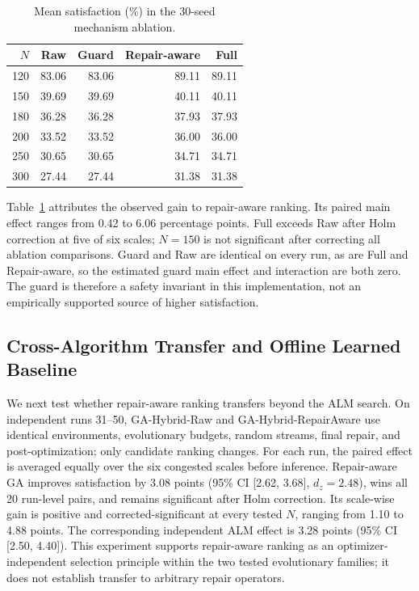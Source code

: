\begin{table}[t]
\centering
\caption{Mean satisfaction (\%) in the 30-seed mechanism ablation.}
\label{tab:official_ablation}
\small
\begin{tabular}{rrrrr}
\toprule
$N$ & Raw & Guard & Repair-aware & Full \\
\midrule
120 & 83.06 & 83.06 & 89.11 & 89.11 \\
150 & 39.69 & 39.69 & 40.11 & 40.11 \\
180 & 36.28 & 36.28 & 37.93 & 37.93 \\
200 & 33.52 & 33.52 & 36.00 & 36.00 \\
250 & 30.65 & 30.65 & 34.71 & 34.71 \\
300 & 27.44 & 27.44 & 31.38 & 31.38 \\
\bottomrule
\end{tabular}
\end{table}

Table~\ref{tab:official_ablation} attributes the observed gain to repair-aware ranking. Its paired main effect ranges from 0.42 to 6.06 percentage points. Full exceeds Raw after Holm correction at five of six scales; $N=150$ is not significant after correcting all ablation comparisons. Guard and Raw are identical on every run, as are Full and Repair-aware, so the estimated guard main effect and interaction are both zero. The guard is therefore a safety invariant in this implementation, not an empirically supported source of higher satisfaction.

\subsection{Cross-Algorithm Transfer and Offline Learned Baseline}
We next test whether repair-aware ranking transfers beyond the ALM search. On independent runs 31--50, GA-Hybrid-Raw and GA-Hybrid-RepairAware use identical environments, evolutionary budgets, random streams, final repair, and post-optimization; only candidate ranking changes. For each run, the paired effect is averaged equally over the six congested scales before inference. Repair-aware GA improves satisfaction by 3.08 points (95\% CI [2.62, 3.68], $d_z=2.48$), wins all 20 run-level pairs, and remains significant after Holm correction. Its scale-wise gain is positive and corrected-significant at every tested $N$, ranging from 1.10 to 4.88 points. The corresponding independent ALM effect is 3.28 points (95\% CI [2.50, 4.40]). This experiment supports repair-aware ranking as an optimizer-independent selection principle within the two tested evolutionary families; it does not establish transfer to arbitrary repair operators.

